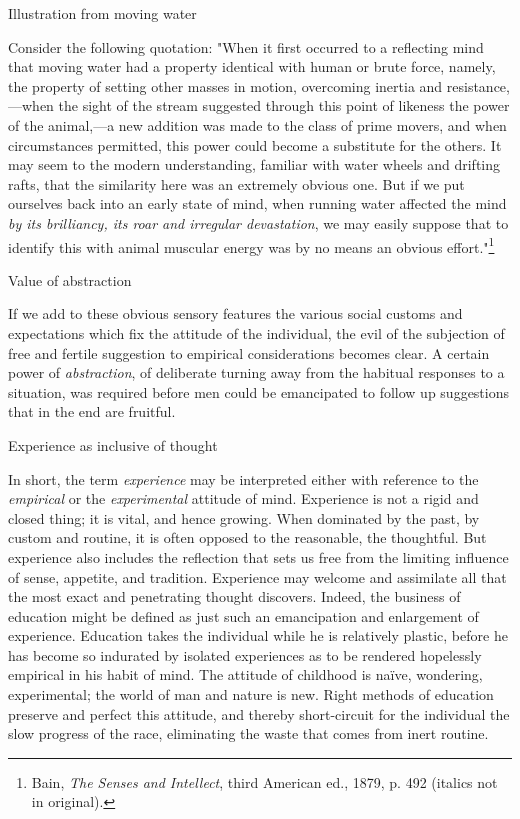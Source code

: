 \documentclass[letterpaper]{book}
\begin{document}
Illustration from moving water

Consider the following quotation: "When it first occurred to a
reflecting mind that moving water had a property identical with human or
brute force, namely, the property of setting other masses in motion,
overcoming inertia and resistance,---when the sight of the stream
suggested through this point of likeness the power of the animal,---a
new addition was made to the class of prime movers, and when
circumstances permitted, this power could become a substitute for the
others. It may seem to the modern understanding, familiar with water
wheels and drifting rafts, that the similarity here was an extremely
obvious one. But if we put ourselves back into an early state of mind,
when running water affected the mind \emph{by its brilliancy, its roar
and irregular devastation}, we may easily suppose that to identify this
with animal muscular energy was by no means an obvious
effort."\footnote{
Bain, \emph{The Senses and Intellect}, third American ed., 1879, p. 492
(italics not in original).
}

Value of abstraction

If we add to these obvious sensory features the various social customs
and expectations which fix the attitude of the individual, the evil of
the subjection of free and fertile suggestion to empirical
considerations
becomes
clear. A certain power of \emph{abstraction}, of deliberate turning away
from the habitual responses to a situation, was required before men
could be emancipated to follow up suggestions that in the end are
fruitful.

Experience as inclusive of thought

In short, the term \emph{experience} may be interpreted either with
reference to the \emph{empirical} or the \emph{experimental} attitude of
mind. Experience is not a rigid and closed thing; it is vital, and hence
growing. When dominated by the past, by custom and routine, it is often
opposed to the reasonable, the thoughtful. But experience also includes
the reflection that sets us free from the limiting influence of sense,
appetite, and tradition. Experience may welcome and assimilate all that
the most exact and penetrating thought discovers. Indeed, the business
of education might be defined as just such an emancipation and
enlargement of experience. Education takes the individual while he is
relatively plastic, before he has become so indurated by isolated
experiences as to be rendered hopelessly empirical in his habit of mind.
The attitude of childhood is naïve, wondering, experimental; the world
of man and nature is new. Right methods of education preserve and
perfect this attitude, and thereby short-circuit for the individual the
slow progress of the race, eliminating the waste that comes from inert
routine.
\end{document}
